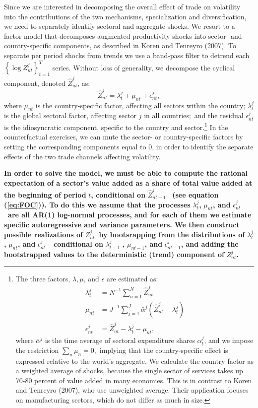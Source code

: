 \documentclass[12pt]{article}
\begin{document}
Since we are interested in decomposing the overall effect of trade on
volatility into the contributions of the two mechanisms, specialization and
diversification, we need to separately identify sectoral and aggregate
shocks. We resort to a factor model that decomposes augmented productivity
shocks into sector- and country-specific components, as described in Koren
and Tenreyro (2007). To separate per period shocks from trends we use a
band-pass filter to detrend each $\left\{ \log {Z_{nt}^{j}}\right\}
_{t=1}^{T}$ series. Without loss of generality, we decompose the cyclical
component, denoted $\hat{Z}_{nt}^{j}$, as: 
\begin{equation*}
\hat{Z}_{nt}^{j}=\lambda _{t}^{j}+\mu _{nt}+\epsilon _{nt}^{j},
\end{equation*}%
where ${\mu _{nt}}$ is the country-specific factor, affecting all sectors
within the country; $\lambda _{t}^{j}$ is the global sectoral factor,
affecting sector $j$ in all countries;\ and the residual $\epsilon _{nt}^{j}$
is the idiosyncratic component, specific to the country and sector.\footnote{%
The three factors, $\lambda ,\mu $, and $\epsilon $ are estimated as: 
\begin{align*}
\lambda _{t}^{j}& =N^{-1}\sum_{n=1}^{N}\hat{Z}_{nt}^{j} \\
\mu _{nt}& =J^{-1}\sum_{j=1}^{J}\bar{\alpha}^{j}\left( \hat{Z}%
_{nt}^{j}-\lambda _{t}^{j}\right) \\
\epsilon _{nt}^{j}& =\hat{Z}_{nt}^{j}-\lambda _{t}^{j}-\mu _{nt}\text{,}
\end{align*}%
where $\bar{\alpha}^{j}$ is the time average of sectoral expenditure shares $%
\alpha _{t}^{j}$, and we impose the restriction $\sum_{n}{\mu _{n}}=0,$
implying that the country-specific effect is expressed relative to the
world's aggregate. We calculate the country factor as a weighted average of
shocks, because the single sector of services takes up 70-80 percent of
value added in many economies. This is in contrast to Koren and Tenreyro
(2007), who use unweighted average. Their application focuses on
manufacturing sectors, which do not differ as much in size.} In the
counterfactual exercises, we can mute the sector- or country-specific
factors by setting the corresponding components equal to 0, in order to
identify the separate effects of the two trade channels affecting volatility.

\textbf{In order to solve the model, we must be able to compute the rational
expectation of a sector's value added as a share of total value added at the
beginning of period }$t$\textbf{, conditional on }$\hat{Z}_{nt-1}^{j}$%
\textbf{\ (see equation (\ref{eq:FOC})). To do this we assume that the
processes }$\lambda _{t}^{j}$\textbf{, }$\mu _{nt}$\textbf{, and }$\epsilon
_{nt}^{j}$\textbf{\ are all AR(1) log-normal processes, and for each of them
we estimate specific autoregressive and variance parameters. We then
construct possible realizations of }$Z_{nt}^{j}$\textbf{\ by bootsrapping
from the distributions of }$\lambda _{t}^{j}$\textbf{, }$\mu _{nt}$\textbf{,
and }$\epsilon _{nt}^{j}$\textbf{\ \ conditional on }$\lambda _{t-1}^{j}$%
\textbf{, }$\mu _{nt-1}$\textbf{, and }$\epsilon _{nt-1}^{j}$\textbf{, and
adding the bootstrapped values to the deterministic (trend) component of }$%
Z_{nt}^{j}$\textbf{.}
\end{document}
